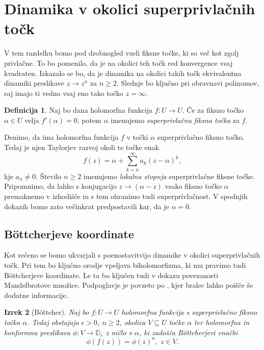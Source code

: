 \documentclass[12pt,a4paper]{amsart}
\theoremstyle{definition} %
\newtheorem{definicija}{Definicija}[section]
\theoremstyle{plain} %
\newtheorem{izrek}[definicija]{Izrek}
\newcommand{\D}{\mathbb D} %
\begin{document}
\section{Dinamika v okolici superprivlačnih točk}
V tem razdelku bomo pod drobnogled vzeli fiksne točke, ki so več kot zgolj privlačne. 
To bo pomenilo, da je na okolici teh točk red konvergence vsaj kvadraten. 
Izkazalo se bo, da je dinamika na okolici takih točk ekvivalentna dinamiki preslikave $z\to z^n$ za $n\geq 2$. 
Slednje bo ključno pri obravnavi polinomov, saj imajo ti vedno vsaj eno tako točko $z=\infty$.

\begin{definicija}\label{def:superattractingFixedPoint}
Naj bo dana holomorfna funkcija $f\colon U \to U$. 
Če za fiksno točko $\alpha \in U$ velja $f'(\alpha) = 0$, 
potem $\alpha$ imenujemo {\em superprivlačna fiksna točka} za $f$.
\end{definicija}

\noindent Denimo, da ima holomorfna funkcija $f$ v točki $\alpha$ superprivlačno fiksno točko. 
Tedaj je njen Taylorjev razvoj okoli te točke enak
$$f(z) = \alpha + \sum_{k = n}^\infty a_k (z - \alpha)^k,$$
kje $a_n \neq 0$. 
Število $n \geq 2$ imenujemo {\em lokalna stopnja} superprivlačne fiksne točke.
Pripomnimo, da lahko s konjugacijo $z \to (\alpha - z)$ vsako fiksno točko $\alpha$ premaknemo 
v izhodišče in s tem ohranimo tudi superprivlačnost.
V spodnjih dokazih bomo zato večinkrat predpostavili kar, da je $\alpha=0$.

\subsection{B{\"o}ttcherjeve koordinate}
Kot rečeno se bomo ukvarjali s poenostavitvijo dinamike v okolici superprivlačnih točk.
Pri tem bo ključno orodje vpeljava biholomorfizma, ki mu pravimo tudi B{\"o}ttcherjeve koordinate.
Le ta bo ključen tudi v dokazu povezanosti Mandelbrotove množice.
Podpoglavje je povzeto po \cite[Poglavje~9]{milnor}, kjer bralec lahko poišče še dodatne informacije.

\begin{izrek}[B{\"o}ttcher]\label{izr:Bottcher}
Naj bo $f \colon U \to U$ holomorfna funkcija s superprivlačno fiksno točko $\alpha$.
Tedaj obstajajo $\epsilon>0$, $n\geq 2$, okolica $V\subseteq U$ točke $\alpha$ ter holomorfna in 
konformna preslikava $\phi \colon V \to \D_\varepsilon$ z ničlo v $\alpha$, ki zadošča B{\"o}ttcherjevi enačbi
$$\phi(f(z))=\phi(z)^n,\; z\in V.$$
\end{izrek}
\end{document}
